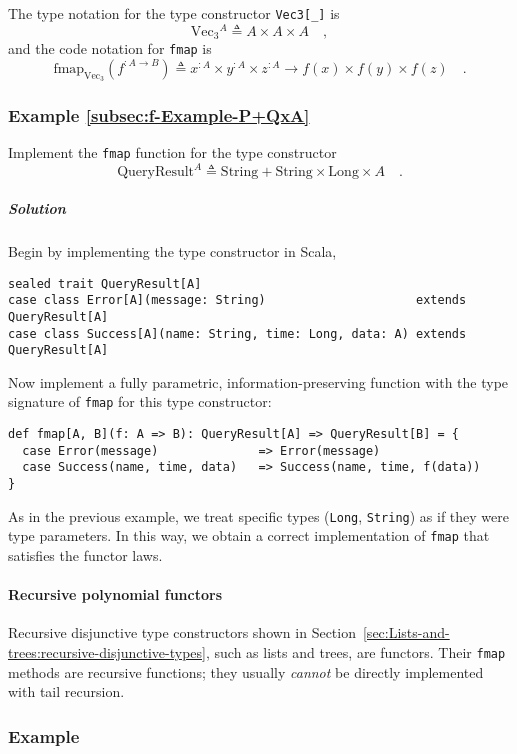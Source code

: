 The type notation for the type constructor \lstinline!Vec3[_]! is
\[
\text{Vec}_{3}{}^{A}\triangleq A\times A\times A\quad,
\]
and the code notation for \lstinline!fmap! is
\[
\text{fmap}_{\text{Vec}_{3}}(f^{:A\rightarrow B})\triangleq x^{:A}\times y^{:A}\times z^{:A}\rightarrow f(x)\times f(y)\times f(z)\quad.
\]


\subsubsection{Example \label{subsec:f-Example-P+QxA}\ref{subsec:f-Example-P+QxA}}

Implement the \lstinline!fmap! function for the type constructor
\[
\text{QueryResult}^{A}\triangleq\text{String}+\text{String}\times\text{Long}\times A\quad.
\]


\subparagraph{Solution}

Begin by implementing the type constructor in Scala,
\begin{lstlisting}
sealed trait QueryResult[A]
case class Error[A](message: String)                     extends QueryResult[A]
case class Success[A](name: String, time: Long, data: A) extends QueryResult[A]
\end{lstlisting}
Now implement a fully parametric, information-preserving function
with the type signature of \lstinline!fmap! for this type constructor:
\begin{lstlisting}
def fmap[A, B](f: A => B): QueryResult[A] => QueryResult[B] = {
  case Error(message)              => Error(message)
  case Success(name, time, data)   => Success(name, time, f(data))
}
\end{lstlisting}
As in the previous example, we treat specific types (\lstinline!Long!,
\lstinline!String!) as if they were type parameters. In this way,
we obtain a correct implementation of \lstinline!fmap! that satisfies
the functor laws.

\paragraph{Recursive polynomial functors}

Recursive disjunctive type constructors shown in Section~\ref{sec:Lists-and-trees:recursive-disjunctive-types},
such as lists and trees, are functors. Their \lstinline!fmap! methods
are recursive functions; they usually \emph{cannot} be directly implemented
with tail recursion. 

\subsubsection{Example }

